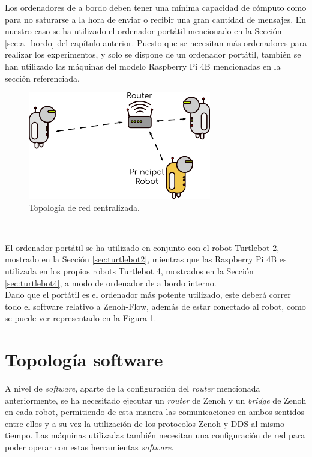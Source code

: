 Los ordenadores de a bordo deben tener una mínima capacidad de cómputo como para
no saturarse a la hora de enviar o recibir una gran cantidad de mensajes.
En nuestro caso se ha utilizado el ordenador portátil mencionado en la Sección
\ref{sec:a_bordo} del capítulo anterior.
Puesto que se necesitan más ordenadores para realizar los experimentos, y solo
se dispone de un ordenador portátil, también se han utilizado las máquinas del
modelo Raspberry Pi 4B mencionadas en la sección referenciada.
\\

\begin{figure} [h!]
  \begin{center}
    \includegraphics[width=8cm]{figs/network_topology}
  \end{center}
  \caption{Topología de red centralizada.}
  \label{fig:network_topology}
\end{figure}\

El ordenador portátil se ha utilizado en conjunto con el robot Turtlebot 2,
mostrado en la Sección \ref{sec:turtlebot2}, mientras que las Raspberry Pi 4B es
utilizada en los propios robots Turtlebot 4, mostrados en la Sección
\ref{sec:turtlebot4}, a modo de ordenador de a bordo interno.
\\

Dado que el portátil es el ordenador más potente utilizado, este deberá correr
todo el software relativo a Zenoh-Flow, además de estar conectado al robot, como
se puede ver representado en la Figura \ref{fig:network_topology}.
\\



\section{Topología software}
\label{sec:topologia_sw}

A nivel de \textit{software}, aparte de la configuración del \textit{router}
mencionada anteriormente, se ha necesitado ejecutar un \textit{router} de Zenoh
y un \textit{bridge} de Zenoh en cada robot, permitiendo de esta manera las
comunicaciones en ambos sentidos entre ellos y a su vez la utilización de los
protocolos Zenoh y DDS al mismo tiempo.
Las máquinas utilizadas también necesitan una configuración de red para poder
operar con estas herramientas \textit{software}.
\\

